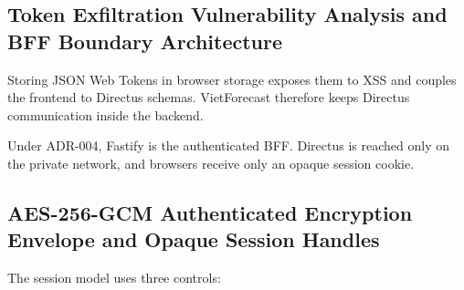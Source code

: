 \subsection{Token Exfiltration Vulnerability Analysis and BFF Boundary Architecture}
\label{subsec:token_threat_analysis_en}
Storing JSON Web Tokens in browser storage exposes them to XSS and couples the frontend to Directus schemas. VietForecast therefore keeps Directus communication inside the backend.

Under ADR-004, Fastify is the authenticated BFF. Directus is reached only on the private network, and browsers receive only an opaque session cookie.

\subsection{AES-256-GCM Authenticated Encryption Envelope and Opaque Session Handles}
\label{subsec:crypto_envelope_en}
The session model uses three controls:

